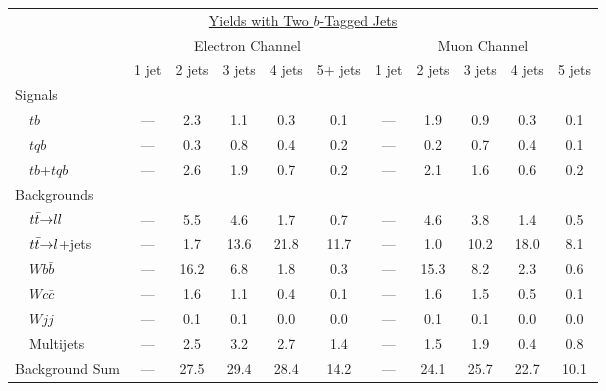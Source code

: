 \vspace{-0.2in}
\begin{table}[!h!tbp]
\begin{center}
\begin{minipage}{6in}
\begin{ruledtabular}
\begin{tabular}{l||ccccc|ccccc}
\multicolumn{11}{c}{\hspace{1in}\underline{Yields with Two $b$-Tagged Jets}} \vspace{0.1in} \\
& \multicolumn{5}{c|}{Electron Channel} & \multicolumn{5}{c}{Muon Channel} \\
                         & 1 jet & 2 jets & 3 jets & 4 jets & 5+ jets
                         & 1 jet & 2 jets & 3 jets & 4 jets & 5 jets \\
\hline
Signals                  &      &       &       &       &      &      &       &       &       &       \\
~~$tb$                   &  --- &   2.3 &   1.1 &   0.3 &  0.1 &  --- &   1.9 &   0.9 &   0.3 &  0.1  \\
~~$tqb$                  &  --- &   0.3 &   0.8 &   0.4 &  0.2 &  --- &   0.2 &   0.7 &   0.4 &  0.1  \\
~~$tb$+$tqb$             &  --- &   2.6 &   1.9 &   0.7 &  0.2 &  --- &   2.1 &   1.6 &   0.6 &  0.2  \\
Backgrounds              &      &       &       &       &      &      &       &       &       &       \\
~~${\mbox{$t\bar{t}$}}{\rightarrow}ll$     &  --- &   5.5 &   4.6 &   1.7 &  0.7 &  --- &   4.6 &   3.8 &   1.4 &  0.5  \\
~~${\mbox{$t\bar{t}$}}{\rightarrow}l$+jets &  --- &   1.7 &  13.6 &  21.8 & 11.7 &  --- &   1.0 &  10.2 &  18.0 &  8.1  \\
~~$Wb\bar{b}$            &  --- &  16.2 &   6.8 &   1.8 &  0.3 &  --- &  15.3 &   8.2 &   2.3 &  0.6  \\
~~$Wc\bar{c}$            &  --- &   1.6 &   1.1 &   0.4 &  0.1 &  --- &   1.6 &   1.5 &   0.5 &  0.1  \\
~~$Wjj$                  &  --- &   0.1 &   0.1 &   0.0 &  0.0 &  --- &   0.1 &   0.1 &   0.0 &  0.0  \\
~~Multijets              &  --- &   2.5 &   3.2 &   2.7 &  1.4 &  --- &   1.5 &   1.9 &   0.4 &  0.8  \\
\hline                                                                                       
Background Sum           &  --- &  27.5 &  29.4 &  28.4 & 14.2 &  --- &  24.1 &  25.7 &  22.7 & 10.1  \\

\end{tabular}
\end{ruledtabular}
\end{minipage}
\end{center}
\end{table}
